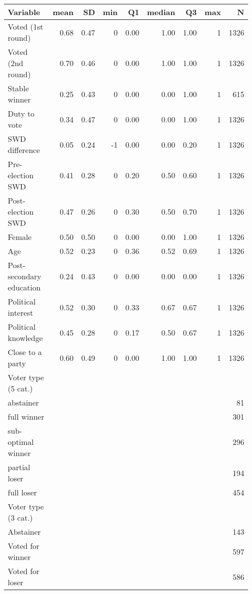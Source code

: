 
\begin{tabular}{l|r|r|r|r|r|r|r|r}
\hline
Variable & mean & SD & min & Q1 & median & Q3 & max & N\\
\hline
Voted (1st round) & 0.68 & 0.47 & 0 & 0.00 & 1.00 & 1.00 & 1 & 1326\\
\hline
Voted (2nd round) & 0.70 & 0.46 & 0 & 0.00 & 1.00 & 1.00 & 1 & 1326\\
\hline
Stable winner & 0.25 & 0.43 & 0 & 0.00 & 0.00 & 1.00 & 1 & 615\\
\hline
Duty to vote & 0.34 & 0.47 & 0 & 0.00 & 0.00 & 1.00 & 1 & 1326\\
\hline
SWD difference & 0.05 & 0.24 & -1 & 0.00 & 0.00 & 0.20 & 1 & 1326\\
\hline
Pre-election SWD & 0.41 & 0.28 & 0 & 0.20 & 0.50 & 0.60 & 1 & 1326\\
\hline
Post-election SWD & 0.47 & 0.26 & 0 & 0.30 & 0.50 & 0.70 & 1 & 1326\\
\hline
Female & 0.50 & 0.50 & 0 & 0.00 & 0.00 & 1.00 & 1 & 1326\\
\hline
Age & 0.52 & 0.23 & 0 & 0.36 & 0.52 & 0.69 & 1 & 1326\\
\hline
Post-secondary education & 0.24 & 0.43 & 0 & 0.00 & 0.00 & 0.00 & 1 & 1326\\
\hline
Political interest & 0.52 & 0.30 & 0 & 0.33 & 0.67 & 0.67 & 1 & 1326\\
\hline
Political knowledge & 0.45 & 0.28 & 0 & 0.17 & 0.50 & 0.67 & 1 & 1326\\
\hline
Close to a party & 0.60 & 0.49 & 0 & 0.00 & 1.00 & 1.00 & 1 & 1326\\
\hline
Voter type (5 cat.) &  &  &  &  &  &  &  & \\
\hline
abstainer &  &  &  &  &  &  &  & 81\\
\hline
full winner &  &  &  &  &  &  &  & 301\\
\hline
sub-optimal winner &  &  &  &  &  &  &  & 296\\
\hline
partial loser &  &  &  &  &  &  &  & 194\\
\hline
full loser &  &  &  &  &  &  &  & 454\\
\hline
Voter type (3 cat.) &  &  &  &  &  &  &  & \\
\hline
Abstainer &  &  &  &  &  &  &  & 143\\
\hline
Voted for winner &  &  &  &  &  &  &  & 597\\
\hline
Voted for loser &  &  &  &  &  &  &  & 586\\
\hline
\end{tabular}
